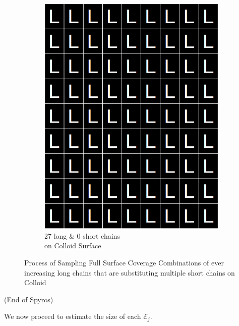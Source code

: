 \documentclass[journal=mamobx,manuscript=article]{achemso}
\begin{document}
\begin{figure}[H]
\begin{subfigure}[b]{0.4\textwidth}
        \includegraphics[scale=0.15]{fig8f.png}
        \caption{27 long \& 0 short chains\\ on Colloid Surface}
        \label{fig:F}
    \end{subfigure}
    \caption{Process of Sampling Full Surface Coverage Combinations of ever increasing long chains that are substituting multiple short chains  on Colloid}
    \label{figure 2}
\end{figure}

(End of Spyros)

\noindent We now proceed to estimate the size of each $\mathcal{E}_j$.

\smallskip
\end{document}
